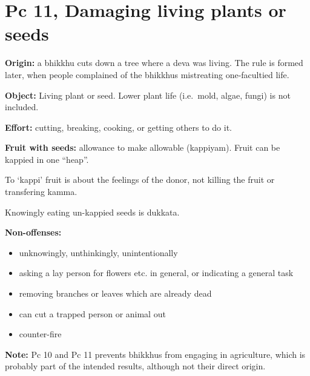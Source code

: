 \section{Pc 11, Damaging living plants or seeds}

\begin{multicols}{2}

\textbf{Origin:} a bhikkhu cuts down a tree where a deva was living. The
rule is formed later, when people complained of the bhikkhus mistreating
one-facultied life.

\textbf{Object:} Living plant or seed. Lower plant life (i.e.~mold,
algae, fungi) is not included.

\textbf{Effort:} cutting, breaking, cooking, or getting others to do it.

\textbf{Fruit with seeds:} allowance to make allowable (kappiyam). Fruit
can be kappied in one ``heap''.

\columnbreak

To `kappi' fruit is about the feelings of the donor, not killing the
fruit or transfering kamma.

Knowingly eating un-kappied seeds is dukkata.

\textbf{Non-offenses:}

\begin{itemize}
\tightlist
\item
  unknowingly, unthinkingly, unintentionally
\item
  asking a lay person for flowers etc. in general, or indicating a
  general task
\item
  removing branches or leaves which are already dead
\item
  can cut a trapped person or animal out
\item
  counter-fire
\end{itemize}

\end{multicols}
\par
\enlargethispage{2\baselineskip}

\textbf{Note:} Pc 10 and Pc 11 prevents bhikkhus from engaging in
agriculture, which is probably part of the intended results, although
not their direct origin.


